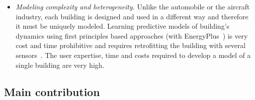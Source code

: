 \begin{itemize}[leftmargin=1cm]
\item \emph{Modeling complexity and heterogeneity.} Unlike the automobile or the aircraft industry, each building is designed and used in a different way and therefore it must be uniquely modeled. Learning predictive models of building's dynamics using first principles based approaches (\eg with EnergyPlus~\cite{Crawley2001319}) is very cost and time prohibitive and requires retrofitting the building with several sensors~\cite{costmpc}. The user expertise, time and costs required to develop a model of a single building are very high.
\end{itemize}

\subsection{Main contribution}

